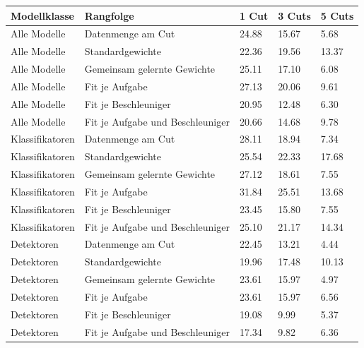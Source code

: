 \begin{tabular}{@{}lllll@{}}
\toprule
Modellklasse & Rangfolge & 1 Cut & 3 Cuts & 5 Cuts \\
\midrule
Alle Modelle & Datenmenge am Cut & 24.88 & 15.67 & 5.68 \\
Alle Modelle & Standardgewichte & 22.36 & 19.56 & 13.37 \\
Alle Modelle & Gemeinsam gelernte Gewichte & 25.11 & 17.10 & 6.08 \\
Alle Modelle & Fit je Aufgabe & 27.13 & 20.06 & 9.61 \\
Alle Modelle & Fit je Beschleuniger & 20.95 & 12.48 & 6.30 \\
Alle Modelle & Fit je Aufgabe und Beschleuniger & 20.66 & 14.68 & 9.78 \\
Klassifikatoren & Datenmenge am Cut & 28.11 & 18.94 & 7.34 \\
Klassifikatoren & Standardgewichte & 25.54 & 22.33 & 17.68 \\
Klassifikatoren & Gemeinsam gelernte Gewichte & 27.12 & 18.61 & 7.55 \\
Klassifikatoren & Fit je Aufgabe & 31.84 & 25.51 & 13.68 \\
Klassifikatoren & Fit je Beschleuniger & 23.45 & 15.80 & 7.55 \\
Klassifikatoren & Fit je Aufgabe und Beschleuniger & 25.10 & 21.17 & 14.34 \\
Detektoren & Datenmenge am Cut & 22.45 & 13.21 & 4.44 \\
Detektoren & Standardgewichte & 19.96 & 17.48 & 10.13 \\
Detektoren & Gemeinsam gelernte Gewichte & 23.61 & 15.97 & 4.97 \\
Detektoren & Fit je Aufgabe & 23.61 & 15.97 & 6.56 \\
Detektoren & Fit je Beschleuniger & 19.08 & 9.99 & 5.37 \\
Detektoren & Fit je Aufgabe und Beschleuniger & 17.34 & 9.82 & 6.36 \\
\bottomrule
\end{tabular}
